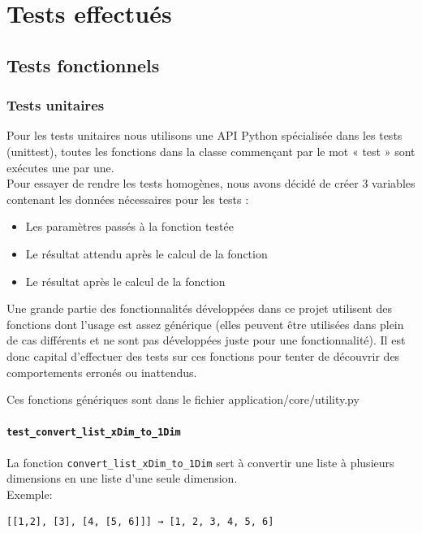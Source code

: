 \documentclass[17pts]{report}
\begin{document}
\chapter{Tests effectués}
\label{cha:Tests}
    \section{Tests fonctionnels}
    \label{sec:Tests fonctionnels}
\subsection{Tests unitaires}

Pour les tests unitaires nous utilisons une API Python spécialisée dans les
tests (unittest), toutes les fonctions dans la classe commençant par le mot «
test » sont exécutes une par une.\\

Pour essayer de rendre les tests homogènes, nous avons décidé de créer 3
variables contenant les données nécessaires pour les tests :
\begin{itemize}
    \item Les paramètres passés à la fonction testée
    \item Le résultat attendu après le calcul de la fonction
    \item Le résultat après le calcul de la fonction
\end{itemize}

Une grande partie des fonctionnalités développées dans ce projet utilisent
des fonctions dont l'usage est assez générique (elles peuvent être utilisées
dans plein de cas différents et ne sont pas développées juste pour une
fonctionnalité). Il est donc capital d'effectuer des tests sur ces fonctions
pour tenter de découvrir des comportements erronés ou inattendus.

Ces fonctions génériques sont dans le fichier application/core/utility.py

\subsubsection{\texttt{test\_convert\_list\_xDim\_to\_1Dim}}
La fonction \verb|convert_list_xDim_to_1Dim| sert à convertir une liste à
plusieurs dimensions en une liste d'une seule dimension.
\\
Exemple:
\begin{verbatim}
[[1,2], [3], [4, [5, 6]]] → [1, 2, 3, 4, 5, 6]
\end{verbatim}
\end{document}
